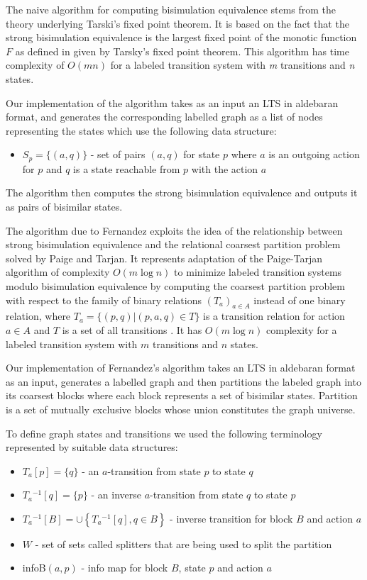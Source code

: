 The naive algorithm for computing bisimulation equivalence stems from the theory underlying 
Tarski's fixed point theorem. It is based on the fact that the strong bisimulation equivalence is 
the largest fixed point of the monotic function $F$ as defined in \cite{ReactiveSystems} given by Tarsky's fixed 
point theorem. This algorithm has time complexity of $O(mn)$ for a labeled transition system with \emph{m} transitions and \emph{n} 
states. 

Our implementation of the algorithm takes as an input an LTS in aldebaran format, and generates the corresponding labelled graph as a list of nodes representing the states which use the following data structure:
\begin{itemize}
	\item $S_p=\{(a, q)\}$ - set of pairs $(a, q)$ for state $p$ where $a$ is an outgoing action for $p$ and $q$ is a state
	reachable from $p$ with the action $a$
\end{itemize}
The algorithm then computes the strong bisimulation equivalence and outputs it as pairs of bisimilar states.

The algorithm due to Fernandez exploits the idea of the relationship between strong bisimulation equivalence 
and the relational coarsest partition problem solved by Paige and Tarjan. It represents adaptation of the 
Paige-Tarjan algorithm of complexity $O(m \log n)$ to minimize labeled transition systems modulo bisimulation 
equivalence by computing the coarsest partition problem with respect to the family of binary relations 
$\left(T_a\right)_{a\in A}$ instead of one binary relation, where $T_a=\{(p,q)|(p,a,q)\in T\}$ is a transition 
relation for action $a\in A$ and $T$ is a set of all transitions \cite{PaigeTarjan}\cite{Fernandez}. It has 
$O(m \log n)$ complexity for a labeled transition system with $m$ transitions and $n$ states. 

Our implementation of Fernandez's algorithm takes an LTS in aldebaran format as an input, generates a labelled graph and 
then partitions the labeled graph into its coarsest blocks where each block represents a set of bisimilar states. Partition 
is a set of mutually exclusive blocks whose union constitutes the graph universe.

To define graph states and transitions we used the following terminology represented by suitable data structures: 
\begin{itemize}
	\item $T_a[p]=\{q\}$ - an $a$-transition from state $p$ to state $q$
	\item $T_a{}^{-1}[q]=\{p\}$ - an inverse $a$-transition from state $q$ to state $p$
	\item $T_a{}^{-1}[B]=\cup \left\{T_a{}^{-1}[q],q\in B\right\}$ - inverse transition for block $B$ and action $a$
	\item $W$ - set of sets called splitters that are being used to split the partition
	\item infoB$(a, p)$ - info map for block $B$, state $p$ and action $a$
\end{itemize}

